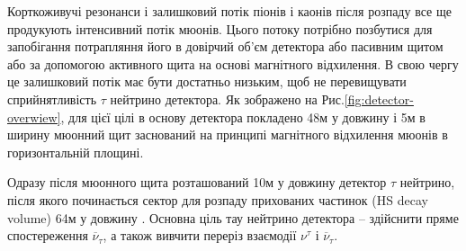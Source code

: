 	

	Корткоживучі резонанси і залишковий потік піонів і каонів після розпаду все ще  продукують інтенсивний потік мюонів. Цього потоку потрібно позбутися для запобігання потрапляння його в довірчий об'єм детектора або пасивним щитом або за допомогою активного щита на основі магнітного відхилення. В свою чергу це залишковий потік має бути достатньо низьким, щоб не перевищувати сприйнятливість $\tau$ нейтрино детектора. Як зображено на  Рис.\ref{fig:detector-overwiew}, для цієї цілі в основу детектора покладено 48м у довжину і 5м в ширину мюонний щит заснований на принципі магнітного відхилення мюонів в горизонтальній площині.

	 
	Одразу після мюонного щита розташований 10м у довжину детектор $\tau$ нейтрино, після якого починається сектор для розпаду прихованих частинок (HS decay volume) 64м у довжину \cite{ship_TP}. Основна ціль тау нейтрино детектора  -- здійснити пряме спостереження $\overline{\nu}_\tau$, а також вивчити переріз взаємодії $\nu^\tau$ і $\overline{\nu}_\tau$.
	 
